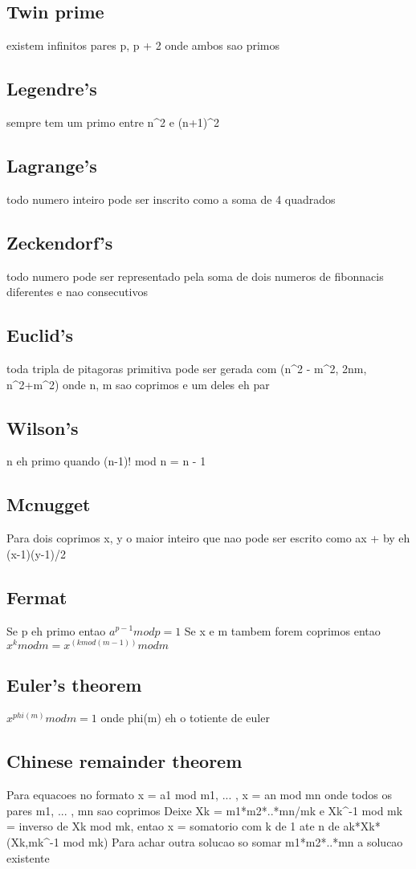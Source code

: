\documentclass{article}
\begin{document}
\subsection{Twin prime} existem infinitos pares p, p + 2 onde ambos sao primos
\subsection{Legendre's} sempre tem um primo entre n^2 e (n+1)^2
\subsection{Lagrange's} todo numero inteiro pode ser inscrito como a soma de 4 quadrados
\subsection{Zeckendorf's} todo numero pode ser representado pela soma de dois numeros de fibonnacis diferentes e nao consecutivos
\subsection{Euclid's} toda tripla de pitagoras primitiva pode ser gerada com 
    (n^2 - m^2, 2nm, n^2+m^2) onde n, m sao coprimos e um deles eh par
\subsection{Wilson's} n eh primo quando (n-1)! mod n = n - 1
\subsection{Mcnugget} Para dois coprimos x, y o maior inteiro que nao pode ser escrito como ax + by eh (x-1)(y-1)/2

\subsection{Fermat} Se p eh primo entao $a^{p-1} mod p = 1$
Se x e m tambem forem coprimos entao $x^k mod m = x^{(k mod(m-1))} mod m$
\subsection{Euler's theorem} $x^{phi(m)} mod m = 1$ onde phi(m) eh o totiente de euler

\subsection{Chinese remainder theorem}
Para equacoes no formato x = a1 mod m1, ... , x = an mod mn onde todos os pares m1, ... , mn sao coprimos
Deixe Xk = m1*m2*..*mn/mk e Xk^-1 mod mk = inverso de Xk mod mk, entao
x = somatorio com k de 1 ate n de ak*Xk*(Xk,mk^-1 mod mk)
Para achar outra solucao so somar m1*m2*..*mn a solucao existente
\end{document}
